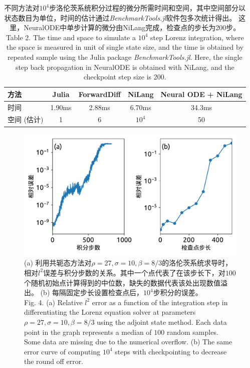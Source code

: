 \documentclass[A4,twoside,UTF8]{ctexart}
\begin{document}
\begin{table}\centering
    \begin{tabularx}{0.8\textwidth}{Xcccc}\toprule
        方法 & Julia & ForwardDiff & NiLang & Neural ODE + NiLang\\
        \hline
        时间          & 1.90ms   &  2.88ms & 6.70ms & 34.3ms\\  %
        空间 (估计)          & 1   &  6 & $10^4$ & 50\\  %
        \bottomrule
    \end{tabularx}
    \caption{不同方法对$10^4$步洛伦茨系统积分过程的微分所需时间和空间，其中空间部分以状态数目为单位，时间的估计通过\textit{BenchmarkTools.jl}软件包多次统计得出。
    这里，NeuralODE中单步计算的微分由NiLang完成，检查点的步长为200步。\\
    Table 2. The time and space to simulate a $10^4$ step Lorenz integration, where the space is measured in unit of single state size, and the time is obtained by repeated sample using the Julia package \textit{BenchmarkTools.jl}. Here, the single step back propagation in NeuralODE is obtained with NiLang, and the checkpoint step size is 200.
    }\label{tbl:lorenztiming}
\end{table}

\begin{figure}
\centering
\includegraphics[width=0.6\columnwidth]{./fig2.pdf}
    \caption{(a) 利用共轭态方法对$\rho=27, \sigma=10, \beta=8/3$的洛伦茨系统求导时，相对$l^2$误差与积分步数的关系。其中一个点代表了在该步长下，对$100$个随机初始点计算得到的中位数，缺失的数据代表该处出现数值溢出。 (b) 每隔固定步长设置检查点后，$10^4$步积分的误差。\\
    Fig. 4. (a) Relative $l^2$ error as a function of the integration step in differentiating the Lorenz equation solver at parameters $\rho=27, \sigma=10, \beta=8/3$ using the adjoint state method.
     Each data point in the graph represents a median of $100$ random samples. Some data are missing due to the numerical overflow.
    (b) The same error curve of computing $10^4$ steps with checkpointing to decrease the round off error.
    }\label{fig:neuralode-error}
\end{figure}
\end{document}
